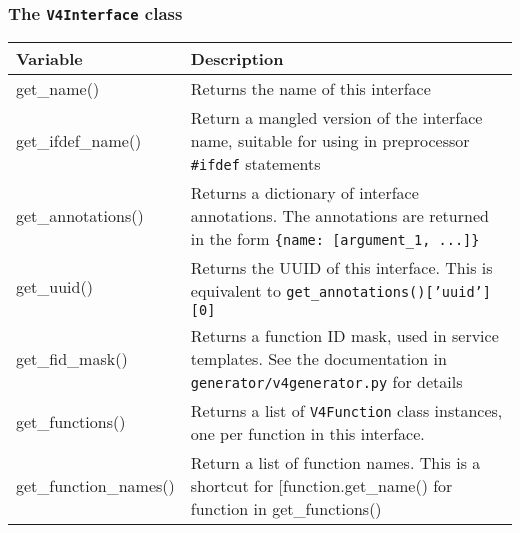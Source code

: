 \subsubsection{The {\tt V4Interface} class}

\begin{tabularx}{\textwidth}{lX}
\textbf{Variable}&\textbf{Description}\\
\hline
get\_name()&Returns the name of this interface\\
get\_ifdef\_name()&Return a mangled version of the interface name, suitable for using in preprocessor {\tt \#ifdef} statements\\
get\_annotations()&Returns a dictionary of interface annotations. The annotations are returned in the form {\tt \{name: [argument\_1, ...]\}} \\
get\_uuid()&Returns the UUID of this interface. This is equivalent to {\tt get\_annotations()['uuid'][0]}\\
get\_fid\_mask()&Returns a function ID mask, used in service templates. See the documentation in {\tt generator/v4generator.py} for details\\
get\_functions()&Returns a list of {\tt V4Function} class instances, one per function in this interface.\\
get\_function\_names()&Return a list of function names. This is a shortcut for [function.get\_name() for function in get\_functions()
\end{tabularx}

